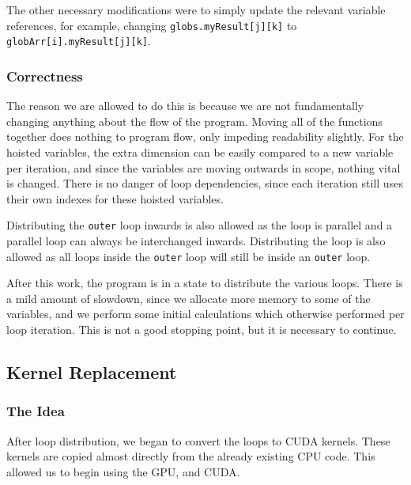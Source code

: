 \documentclass[12pt, oneside]{article}
\begin{document}
The other necessary modifications were to simply update the relevant variable references, for example, changing \texttt{globs.myResult[j][k]} to\\ \texttt{globArr[i].myResult[j][k]}.
\subsubsection{Correctness}
The reason we are allowed to do this is because we are not fundamentally changing anything about the flow of the program. Moving all of the functions together does nothing to program flow, only impeding readability slightly. For the hoisted variables, the extra dimension can be easily compared to a new variable per iteration, and since the variables are moving outwards in scope, nothing vital is changed. There is no danger of loop dependencies, since each iteration still uses their own indexes for these hoisted variables.

Distributing the \texttt{outer} loop inwards is also allowed as the loop is
parallel and a parallel loop can always be interchanged inwards. Distributing
the loop is also allowed as all loops inside the \texttt{outer} loop will still
be inside an \texttt{outer} loop.
			
After this work, the program is in a state to distribute the various loops. There is a mild amount of slowdown, since we allocate more memory to some of the variables, and we perform some initial calculations which otherwise performed per loop iteration. This is not a good stopping point, but it is necessary to continue.
\subsection{Kernel Replacement}
\subsubsection{The Idea}
After loop distribution, we began to convert the loops to CUDA kernels. These kernels are copied almost directly from the already existing CPU code. This allowed us to begin using the GPU, and CUDA.
\end{document}
